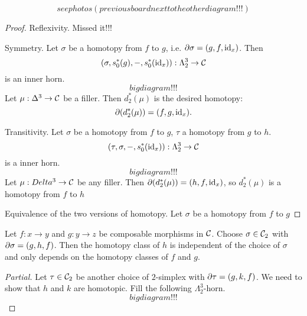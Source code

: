 {\begin{proposition}
\[
see photos (previous board next to the other diagram!!!)
\]
\end{proposition}

\begin{proof}
Reflexivity. Missed it!!!

Symmetry. Let $\sigma$ be a homotopy from $f$ to $g$, i.e. $\partial\sigma=(g,f,\operatorname{id}_x)$. Then
\[(\sigma,s_0^*(g),-,s_0^*(\operatorname{id}_x)):\Lambda^3_2\to\mathcal{C}\]
is an inner horn.
\[big diagram!!!\]
Let $\mu:\Delta^3\to\mathcal{C}$ be a filler. Then $d_2^*(\mu)$ is the desired homotopy:
\[\partial(d_2^*(\mu))=(f,g,\operatorname{id}_x).\]

Transitivity. Let $\sigma$ be a homotopy from $f$ to $g$, $\tau$ a homotopy from $g$ to $h$.
\[(\tau,\sigma,-,s_0^*(\operatorname{id}_x)):\Lambda^3_2\to\mathcal{C}\]
is a inner horn.
\[big diagram!!!\]
Let $\mu:Delta^3\to\mathcal{C}$ be any filler. Then $\partial(d_2^*(\mu))=(h,f,\operatorname{id}_x)$, so $d_2^*(\mu)$ is a homotopy from $f$ to $h$

Equivalence of the two versions of homotopy. Let $\sigma$ be a homotopy from $f$ to $g$
\end{proof}

\begin{proposition}
Let $f:x\to y$ and $g:y\to z$ be composable morphisms in $\mathcal{C}$. Choose $\sigma\in\mathcal{C}_2$ with $\partial\sigma=(g,h,f)$. Then the homotopy class of $h$ is independent of the choice of $\sigma$ and only depends on the homotopy classes of $f$ and $g$.
\end{proposition}

\begin{proof}[Partial]
Let $\tau\in\mathcal{C}_2$ be another choice of $2$-simplex with $\partial\tau=(g,k,f)$. We need to show that $h$ and $k$ are homotopic. Fill the following $\Lambda^3_2$-horn.
\[bigdiagram!!!\]
\end{proof}
}

